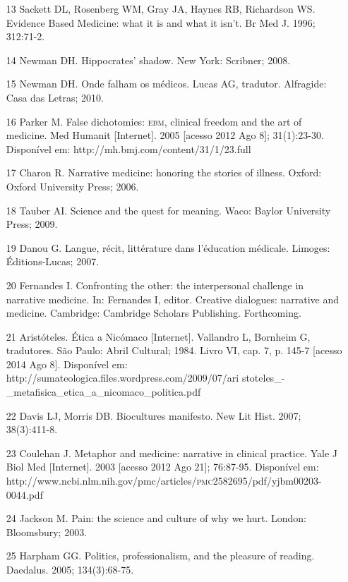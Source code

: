 \documentclass{article}
\begin{document}
\begin{itemize}
\item[13] Sackett DL, Rosenberg WM, Gray JA, Haynes RB, Richardson WS. Evidence
Based Medicine: what it is and what it isn’t. Br Med J. 1996; 312:71-2.

\item[14] Newman DH. Hippocrates’ shadow. New York: Scribner; 2008.

\item[15] Newman DH. Onde falham os médicos. Lucas AG, tradutor. Alfragide: Casa
das Letras; 2010.

\item[16] Parker M. False dichotomies: \textsc{ebm}, clinical freedom and the art of
medicine. Med Humanit [Internet]. 2005 [acesso 2012 Ago 8]; 31(1):23-30.
Disponível em: http://mh.bmj.com/content/31/1/23.full

\item[17] Charon R. Narrative medicine: honoring the stories of illness. Oxford:
Oxford University Press; 2006.

\item[18] Tauber AI. Science and the quest for meaning. Waco: Baylor University
Press; 2009.

\item[19] Danou G. Langue, récit, littérature dans l’éducation médicale.
Limoges: Éditions-Lucas; 2007.

\item[20] Fernandes I. Confronting the other: the interpersonal challenge in
narrative medicine. In: Fernandes I, editor. Creative dialogues: narrative and
medicine. Cambridge: Cambridge Scholars Publishing. Forthcoming.

\item[21] Aristóteles. Ética a Nicómaco [Internet]. Vallandro L, Bornheim G,
tradutores. São Paulo: Abril Cultural; 1984. Livro VI, cap. 7, p. 145-7 [acesso
2014 Ago 8]. Disponível em: http://sumateologica.files.wordpress.com/2009/07/ari
stoteles\_{}-\_{}metafisica\_{}etica\_{}a\_{}nicomaco\_{}politica.pdf

\item[22] Davis LJ, Morris DB. Biocultures manifesto. New Lit Hist. 2007;
38(3):411-8.

\item[23] Coulehan J. Metaphor and medicine: narrative in clinical practice.
Yale J Biol Med [Internet]. 2003 [acesso 2012 Ago 21]; 76:87-95. Disponível em:
http://www.ncbi.nlm.nih.gov/pmc/articles/\textsc{pmc}2582695/pdf/yjbm00203-0044.pdf

\item[24] Jackson M. Pain: the science and culture of why we hurt. London:
Bloomsbury; 2003.

\item[25] Harpham GG. Politics, professionalism, and the pleasure of reading.
Daedalus. 2005; 134(3):68-75.

\end{itemize}
\end{document}
